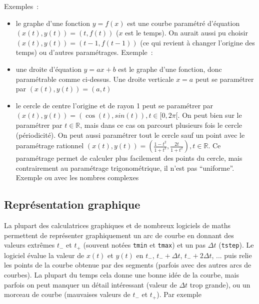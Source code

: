 \documentclass[a4paper,11pt]{article}
\newcommand{\R}{{\mathbb{R}}}
\begin{document}
\begin{giacjshere}
Exemples~:
\begin{itemize}
\item le graphe d'une fonction $y=f(x)$ est une courbe param\'etr\'e
d'\'equation $(x(t),y(t))=(t,f(t))$ ($x$ est le temps). 
On aurait aussi pu choisir
$(x(t),y(t))=(t-1,f(t-1))$ (ce qui revient \`a changer l'origine des
temps) ou d'autres param\'etrages.
Exemple~: \\
\item une droite d'\'equation $y=ax+b$ est le graphe d'une fonction,
donc param\'etrable comme ci-dessus. Une droite verticale $x=a$ peut
se param\'etrer par $(x(t),y(t))=(a,t)$
\item le cercle de centre l'origine et de rayon 1 peut se param\'etrer
  par $(x(t),y(t))=(\cos(t),sin(t)), t \in [0,2\pi[$. On peut bien sur
le param\'etrer par $t \in \R$, mais dans ce cas on parcourt plusieurs
fois le cercle (p\'eriodicit\'e). On peut aussi param\'etrer tout le
cercle sauf un point avec le param\'etrage rationnel
$(x(t),y(t))=(\frac{1-t^2}{1+t^2},\frac{2t}{1+t^2}), t \in \R$. Ce
param\'etrage permet de calculer plus facilement des points
du cercle, mais contrairement au param\'etrage trigonom\'etrique,
il n'est pas ``uniforme''.\\
Exemple 
ou avec les nombres complexes\\
\end{itemize}

\subsection{Repr\'esentation graphique} 
La plupart des calculatrices graphiques
et de nombreux logiciels de maths permettent de
repr\'esenter graphiquement un arc de courbe en donnant des valeurs
extr\^emes $t_-$ et $t_+$ (souvent not\'ees \verb|tmin| et
\verb|tmax|) et un pas $\Delta t$ (\verb|tstep|). Le logiciel \'evalue
la valeur de $x(t)$ et $y(t)$ en $t_-$, $t_-+\Delta t$, $t_-+2\Delta
t$, ... puis relie les points de la courbe obtenue par des segments
(parfois avec des autres arcs de courbes). La plupart du temps
cela donne une bonne id\'ee de la courbe, mais parfois on peut
manquer un d\'etail int\'eressant (valeur de $\Delta t$ trop
grande), ou un morceau de courbe (mauvaises
valeurs de $t_-$ et $t_+$). Par exemple 


\end{giacjshere}
\end{document}
